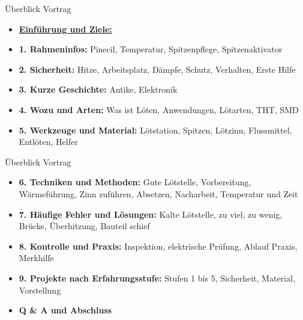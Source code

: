 \begin{frame}{Überblick Vortrag}
\small
\begin{itemize}\setlength{\itemsep}{2mm}
  \item \textbf{\underline{Einführung und Ziele:}}
  \item \textbf{1. Rahmeninfos:} Pinecil, Temperatur, Spitzenpflege, Spitzenaktivator
  \item \textbf{2. Sicherheit:} Hitze, Arbeitsplatz, Dämpfe, Schutz, Verhalten, Erste Hilfe
  \item \textbf{3. Kurze Geschichte:} Antike, Elektronik
  \item \textbf{4. Wozu und Arten:} Was ist Löten, Anwendungen, Lötarten, THT, SMD
  \item \textbf{5. Werkzeuge und Material:} Lötstation, Spitzen, Lötzinn, Flussmittel, Entlöten, Helfer
\end{itemize}
\end{frame}

\begin{frame}{Überblick Vortrag}
\begin{itemize}\setlength{\itemsep}{2mm}
  \item \textbf{6. Techniken und Methoden:} Gute Lötstelle, Vorbereitung, Wärmeführung, Zinn zuführen, Absetzen, Nacharbeit, Temperatur und Zeit
  \item \textbf{7. Häufige Fehler und Lösungen:} Kalte Lötstelle, zu viel, zu wenig, Brücke, Überhitzung, Bauteil schief
  \item \textbf{8. Kontrolle und Praxis:} Inspektion, elektrische Prüfung, Ablauf Praxis, Merkhilfe
  \item \textbf{9. Projekte nach Erfahrungsstufe:} Stufen 1 bis 5, Sicherheit, Material, Vorstellung
  \item \textbf{Q \& A und Abschluss}
\end{itemize}
\end{frame}
